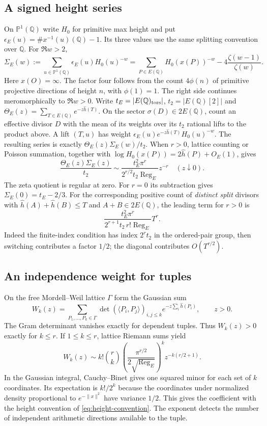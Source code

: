 \documentclass[11pt]{article}
\newcommand{\Q}{\mathbb{Q}}
\newcommand{\Reg}{\operatorname{Reg}}
\begin{document}
\subsection{A signed height series}
On $\mathbb P^1(\Q)$ write $H_0$ for primitive max height and put
$\epsilon_E(u)=\#x^{-1}(u)(\Q)-1$. Its three values use the same
splitting convention over $\Q$. For $\Re w>2$,
\[
 \Sigma_E(w):=\sum_{u\in\mathbb P^1(\Q)}\epsilon_E(u)H_0(u)^{-w}
 =\sum_{P\in E(\Q)} H_0(x(P))^{-w}
       -4\frac{\zeta(w-1)}{\zeta(w)} .
\]
Here $x(O)=\infty$. The factor four follows from the count $4\phi(n)$
of primitive projective directions of height $n$, with $\phi(1)=1$.
The right side continues meromorphically to $\Re w>0$.
Write $t_E=|E(\Q)_{\rm tors}|$, $t_2=|E(\Q)[2]|$ and
$\Theta_E(z)=\sum_{T\in E(\Q)} e^{-z\widehat h(T)}$.
On the sector $\sigma(D)\in 2E(\Q)$, count an effective divisor $D$
with the mean of its weights over its $t_2$ rational lifts to the
product above. A lift $(T,u)$ has weight
$\epsilon_E(u)e^{-z\widehat h(T)}H_0(u)^{-w}$. The resulting series
is exactly $\Theta_E(z)\Sigma_E(w)/t_2$.
When $r>0$, lattice counting or Poisson summation, together with
$\log H_0(x(P))=2\widehat h(P)+O_E(1)$, gives
\[
 \frac{\Theta_E(z)\Sigma_E(z)}{t_2}\sim
 \frac{t_E^2\pi^r}{2^{r/2}t_2\Reg_E}z^{-r}\quad(z\downarrow0).
\]
The zeta quotient is regular at zero. For $r=0$ its subtraction gives
$\Sigma_E(0)=t_E-2/3$. For the corresponding positive count of
\emph{distinct split} divisors with $\widehat h(A)+\widehat h(B)\le T$
and $A+B\in2E(\Q)$, the leading term for $r>0$ is
\[
 \frac{t_E^2\pi^r}{2^{r+1}t_2\,r!\Reg_E}T^r .
\]
Indeed the finite-index condition has index $2^r t_2$ in the
ordered-pair group, then switching contributes a factor $1/2$;
the diagonal contributes $O(T^{r/2})$.

\subsection{An independence weight for tuples}
On the free Mordell--Weil lattice $\Gamma$ form the Gaussian sum
\[
 W_k(z)=\sum_{P_1,\ldots,P_k\in\Gamma}
 \det(\langle P_i,P_j\rangle)_{i,j\le k}
 e^{-z\sum_i\widehat h(P_i)},\qquad z>0 .
\]
The Gram determinant vanishes exactly for dependent tuples.
Thus $W_k(z)>0$ exactly for $k\le r$. If $1\le k\le r$, lattice
Riemann sums yield
\[
 W_k(z)\sim k!\binom rk
  \left(\frac{\pi^{r/2}}{2\sqrt{\Reg_E}}\right)^k
  z^{-k(r/2+1)}.
\]
In the Gaussian integral, Cauchy--Binet gives one squared minor for
each set of $k$ coordinates. Its expectation is $k!/2^k$ because
the coordinates under normalized density proportional to
$e^{-\|x\|^2}$ have variance $1/2$. This gives the coefficient with
the height convention of \eqref{eq:height-convention}. The exponent
detects the number of independent arithmetic directions available
to the tuple.
\end{document}
